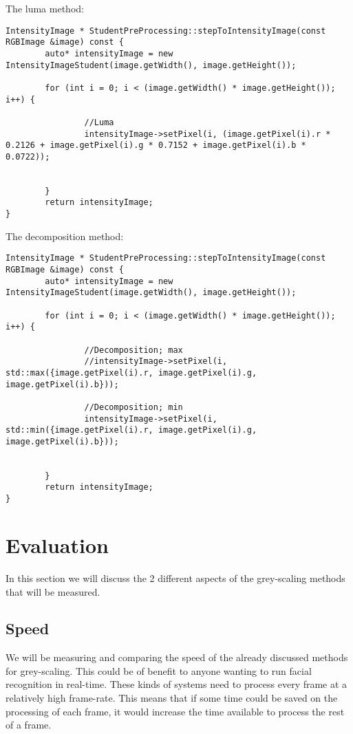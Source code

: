 \documentclass[a4paper]{article}
\begin{document}
The luma method:
\lstset{language=C++}
\begin{lstlisting}
IntensityImage * StudentPreProcessing::stepToIntensityImage(const RGBImage &image) const {
        auto* intensityImage = new IntensityImageStudent(image.getWidth(), image.getHeight());

        for (int i = 0; i < (image.getWidth() * image.getHeight()); i++) {

                //Luma
                intensityImage->setPixel(i, (image.getPixel(i).r * 0.2126 + image.getPixel(i).g * 0.7152 + image.getPixel(i).b * 0.0722));


        }
        return intensityImage;
}

\end{lstlisting}
\newpage

The decomposition method:
\lstset{language=C++}
\begin{lstlisting}
IntensityImage * StudentPreProcessing::stepToIntensityImage(const RGBImage &image) const {
        auto* intensityImage = new IntensityImageStudent(image.getWidth(), image.getHeight());

        for (int i = 0; i < (image.getWidth() * image.getHeight()); i++) {

                //Decomposition; max
                //intensityImage->setPixel(i, std::max({image.getPixel(i).r, image.getPixel(i).g, image.getPixel(i).b}));

                //Decomposition; min
                intensityImage->setPixel(i, std::min({image.getPixel(i).r, image.getPixel(i).g, image.getPixel(i).b}));


        }
        return intensityImage;
}

\end{lstlisting}

\newpage
\section{Evaluation}
In this section we will discuss the 2 different aspects of the grey-scaling methods that will be measured.

\subsection{Speed}
We will be measuring and comparing the speed of the already discussed methods for grey-scaling. This could be of benefit to anyone wanting to run facial recognition in real-time. These kinds of systems need to process every frame at a relatively high frame-rate. This means that if some time could be saved on the processing of each frame, it would increase the time available to process the rest of a frame.
\end{document}
